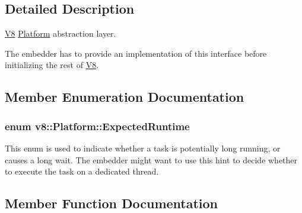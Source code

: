 \subsection{Detailed Description}
\hyperlink{classv8_1_1_v8}{V8} \hyperlink{classv8_1_1_platform}{Platform} abstraction layer.

The embedder has to provide an implementation of this interface before initializing the rest of \hyperlink{classv8_1_1_v8}{V8}. 

\subsection{Member Enumeration Documentation}
\subsubsection[{\texorpdfstring{Expected\+Runtime}{ExpectedRuntime}}]{\setlength{\rightskip}{0pt plus 5cm}enum {\bf v8\+::\+Platform\+::\+Expected\+Runtime}}\hypertarget{classv8_1_1_platform_ace7f666b2b5995bb0e898e12fa660718}{}\label{classv8_1_1_platform_ace7f666b2b5995bb0e898e12fa660718}
This enum is used to indicate whether a task is potentially long running, or causes a long wait. The embedder might want to use this hint to decide whether to execute the task on a dedicated thread. 

\subsection{Member Function Documentation}
